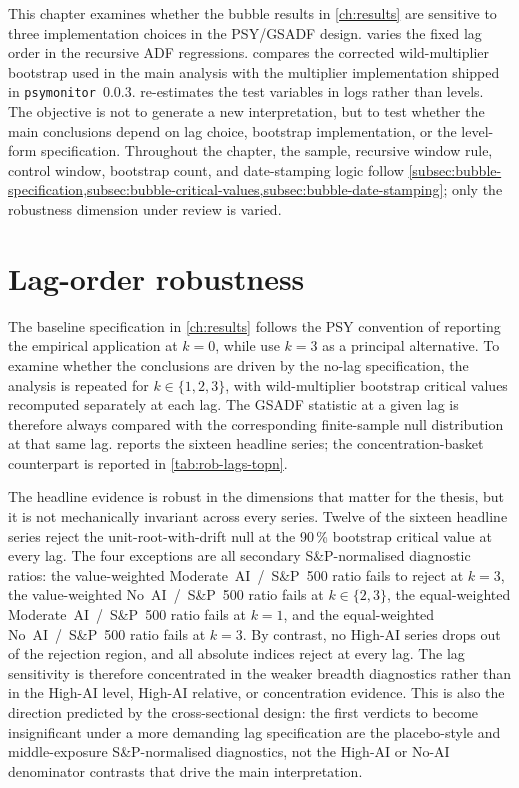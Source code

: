 This chapter examines whether the bubble results in \cref{ch:results} are sensitive to three implementation choices in the PSY/GSADF design.  varies the fixed lag order in the recursive ADF regressions.  compares the corrected wild-multiplier bootstrap used in the main analysis with the multiplier implementation shipped in \texttt{psymonitor}~0.0.3.  re-estimates the test variables in logs rather than levels. The objective is not to generate a new interpretation, but to test whether the main conclusions depend on lag choice, bootstrap implementation, or the level-form specification. Throughout the chapter, the sample, recursive window rule, control window, bootstrap count, and date-stamping logic follow \cref{subsec:bubble-specification,subsec:bubble-critical-values,subsec:bubble-date-stamping}; only the robustness dimension under review is varied.


\section{Lag-order robustness}
\label{sec:rob-lags}

The baseline specification in \cref{ch:results} follows the PSY convention of reporting the empirical application at $k=0$, while \citet[footnote~22]{phillipsShiYu2015a} use $k=3$ as a principal alternative. To examine whether the conclusions are driven by the no-lag specification, the analysis is repeated for $k\in\{1,2,3\}$, with wild-multiplier bootstrap critical values recomputed separately at each lag. The GSADF statistic at a given lag is therefore always compared with the corresponding finite-sample null distribution at that same lag.  reports the sixteen headline series; the concentration-basket counterpart is reported in \cref{tab:rob-lags-topn}.

The headline evidence is robust in the dimensions that matter for the thesis, but it is not mechanically invariant across every series. Twelve of the sixteen headline series reject the unit-root-with-drift null at the 90\,\% bootstrap critical value at every lag. The four exceptions are all secondary S\&P-normalised diagnostic ratios: the value-weighted Moderate~AI~/~S\&P~500 ratio fails to reject at $k=3$, the value-weighted No~AI~/~S\&P~500 ratio fails at $k\in\{2,3\}$, the equal-weighted Moderate~AI~/~S\&P~500 ratio fails at $k=1$, and the equal-weighted No~AI~/~S\&P~500 ratio fails at $k=3$. By contrast, no High-AI series drops out of the rejection region, and all absolute indices reject at every lag. The lag sensitivity is therefore concentrated in the weaker breadth diagnostics rather than in the High-AI level, High-AI relative, or concentration evidence. This is also the direction predicted by the cross-sectional design: the first verdicts to become insignificant under a more demanding lag specification are the placebo-style and middle-exposure S\&P-normalised diagnostics, not the High-AI or No-AI denominator contrasts that drive the main interpretation.

